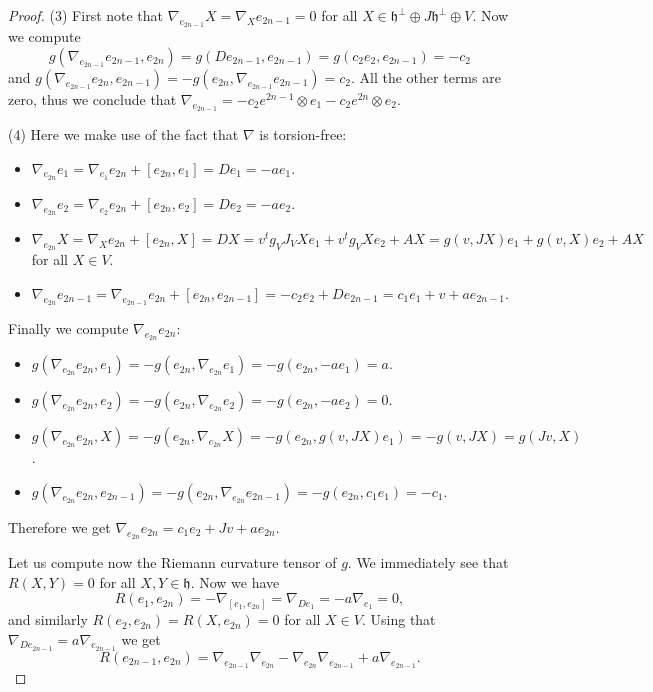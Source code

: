 \documentclass[10pt,a4paper]{amsart}
\newcommand{\frh}{\mathfrak{h}}
\begin{document}
\begin{proof}
    (3) First note that $\nabla_{e_{2n-1}}X=\nabla_Xe_{2n-1}=0$ for all $X\in\frh^\perp\oplus J\frh^\perp\oplus V$. Now we compute $$g(\nabla_{e_{2n-1}}e_{2n-1},e_{2n})=g(De_{2n-1},e_{2n-1})=g(c_2e_2,e_{2n-1})=-c_2$$ and $g(\nabla_{e_{2n-1}}e_{2n},e_{2n-1})=-g(e_{2n},\nabla_{e_{2n-1}}e_{2n-1})=c_2$. All the other terms are zero, thus we conclude that $\nabla_{e_{2n-1}}=-c_2e^{2n-1}\otimes e_1-c_2e^{2n}\otimes e_2$.\medskip

    (4) Here we make use of the fact that $\nabla$ is torsion-free: \begin{itemize}
        \item $\nabla_{e_{2n}}e_1=\nabla_{e_1}e_{2n}+[e_{2n},e_1]=De_1=-ae_1$.
        \item $\nabla_{e_{2n}}e_2=\nabla_{e_2}e_{2n}+[e_{2n},e_2]=De_2=-ae_2$.
        \item $\nabla_{e_{2n}}X=\nabla_Xe_{2n}+[e_{2n},X]=DX=v^tg_VJ_VXe_1+v^tg_VXe_2+AX=g(v,JX)e_1+g(v,X)e_2+AX$ for all $X\in V$.
        \item $\nabla_{e_{2n}}e_{2n-1}=\nabla_{e_{2n-1}}e_{2n}+[e_{2n},e_{2n-1}]=-c_2e_2+De_{2n-1}=c_1e_1+v+ae_{2n-1}$.
    \end{itemize}

    Finally we compute $\nabla_{e_{2n}}e_{2n}$: \begin{itemize}
        \item $g(\nabla_{e_{2n}}e_{2n},e_1)=-g(e_{2n},\nabla_{e_{2n}}e_1)=-g(e_{2n},-ae_1)=a$.
        \item $g(\nabla_{e_{2n}}e_{2n},e_2)=-g(e_{2n},\nabla_{e_{2n}}e_2)=-g(e_{2n},-ae_2)=0$.
        \item $g(\nabla_{e_{2n}}e_{2n},X)=-g(e_{2n},\nabla_{e_{2n}}X)=-g(e_{2n},g(v,JX)e_1)=-g(v,JX)=g(Jv,X)$.
        \item $g(\nabla_{e_{2n}}e_{2n},e_{2n-1})=-g(e_{2n},\nabla_{e_{2n}}e_{2n-1})=-g(e_{2n},c_1e_1)=-c_1$.
    \end{itemize}

    Therefore we get $\nabla_{e_{2n}}e_{2n}=c_1e_2+Jv+ae_{2n}$.\medskip
    
    Let us compute now the Riemann curvature tensor of $g$. We immediately see that $R(X,Y)=0$ for all $X,Y\in\frh$. Now we have $$R(e_1,e_{2n})=-\nabla_{[e_1,e_{2n}]}=\nabla_{De_1}=-a\nabla_{e_1}=0,$$ and similarly $R(e_2,e_{2n})=R(X,e_{2n})=0$ for all $X\in V$. Using that $\nabla_{De_{2n-1}}=a\nabla_{e_{2n-1}}$ we get $$R(e_{2n-1},e_{2n})=\nabla_{e_{2n-1}}\nabla_{e_{2n}}-\nabla_{e_{2n}}\nabla_{e_{2n-1}}+a\nabla_{e_{2n-1}}.$$


\end{proof}
\end{document}
